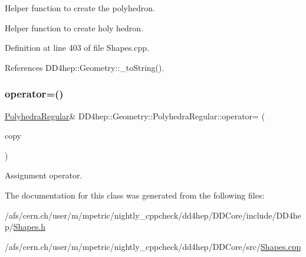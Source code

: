 Helper function to create the polyhedron. 

Helper function to create holy hedron. 

Definition at line 403 of file Shapes.\+cpp.



References D\+D4hep\+::\+Geometry\+::\+\_\+to\+String().

\hypertarget{class_d_d4hep_1_1_geometry_1_1_polyhedra_regular_a2a90249db54bc0915bfd613aa4071cc3}{}\label{class_d_d4hep_1_1_geometry_1_1_polyhedra_regular_a2a90249db54bc0915bfd613aa4071cc3} 
\subsubsection{\texorpdfstring{operator=()}{operator=()}}
{\footnotesize\ttfamily \hyperlink{class_d_d4hep_1_1_geometry_1_1_polyhedra_regular}{Polyhedra\+Regular}\& D\+D4hep\+::\+Geometry\+::\+Polyhedra\+Regular\+::operator= (\begin{DoxyParamCaption}\item[{const \hyperlink{class_d_d4hep_1_1_geometry_1_1_polyhedra_regular}{Polyhedra\+Regular} \&}]{copy }\end{DoxyParamCaption})\hspace{0.3cm}{\ttfamily [default]}}



Assignment operator. 



The documentation for this class was generated from the following files\+:\begin{DoxyCompactItemize}
\item 
/afs/cern.\+ch/user/m/mpetric/nightly\+\_\+cppcheck/dd4hep/\+D\+D\+Core/include/\+D\+D4hep/\hyperlink{_shapes_8h}{Shapes.\+h}\item 
/afs/cern.\+ch/user/m/mpetric/nightly\+\_\+cppcheck/dd4hep/\+D\+D\+Core/src/\hyperlink{_shapes_8cpp}{Shapes.\+cpp}\end{DoxyCompactItemize}
